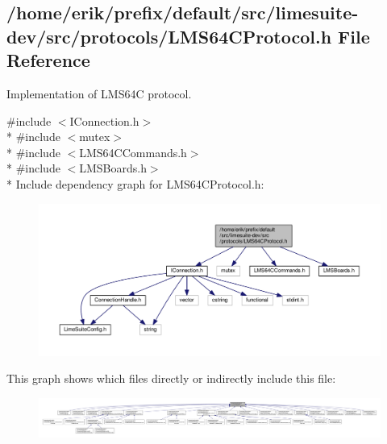 \subsection{/home/erik/prefix/default/src/limesuite-\/dev/src/protocols/\+L\+M\+S64\+C\+Protocol.h File Reference}
\label{LMS64CProtocol_8h}


Implementation of L\+M\+S64C protocol.  


{\ttfamily \#include $<$I\+Connection.\+h$>$}\\*
{\ttfamily \#include $<$mutex$>$}\\*
{\ttfamily \#include $<$L\+M\+S64\+C\+Commands.\+h$>$}\\*
{\ttfamily \#include $<$L\+M\+S\+Boards.\+h$>$}\\*
Include dependency graph for L\+M\+S64\+C\+Protocol.\+h\+:
\nopagebreak
\begin{figure}[H]
\begin{center}
\leavevmode
\includegraphics[width=350pt]{d3/df8/LMS64CProtocol_8h__incl}
\end{center}
\end{figure}
This graph shows which files directly or indirectly include this file\+:
\nopagebreak
\begin{figure}[H]
\begin{center}
\leavevmode
\includegraphics[width=350pt]{db/dbd/LMS64CProtocol_8h__dep__incl}
\end{center}
\end{figure}
